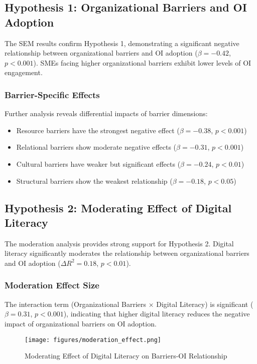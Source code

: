 \subsection{Hypothesis 1: Organizational Barriers and OI Adoption}

The SEM results confirm Hypothesis 1, demonstrating a significant negative relationship between organizational barriers and OI adoption ($\beta = -0.42$, $p < 0.001$). SMEs facing higher organizational barriers exhibit lower levels of OI engagement.

\subsubsection{Barrier-Specific Effects}
Further analysis reveals differential impacts of barrier dimensions:
\begin{itemize}
    \item Resource barriers have the strongest negative effect ($\beta = -0.38$, $p < 0.001$)
    \item Relational barriers show moderate negative effects ($\beta = -0.31$, $p < 0.001$)
    \item Cultural barriers have weaker but significant effects ($\beta = -0.24$, $p < 0.01$)
    \item Structural barriers show the weakest relationship ($\beta = -0.18$, $p < 0.05$)
\end{itemize}

\subsection{Hypothesis 2: Moderating Effect of Digital Literacy}

The moderation analysis provides strong support for Hypothesis 2. Digital literacy significantly moderates the relationship between organizational barriers and OI adoption ($\Delta R^2 = 0.18$, $p < 0.01$).

\subsubsection{Moderation Effect Size}
The interaction term (Organizational Barriers × Digital Literacy) is significant ($\beta = 0.31$, $p < 0.001$), indicating that higher digital literacy reduces the negative impact of organizational barriers on OI adoption.

\begin{figure}[H]
\centering
\texttt{[image: figures/moderation\_effect.png]}
\caption{Moderating Effect of Digital Literacy on Barriers-OI Relationship}
\label{fig:moderation_effect}
\end{figure}

